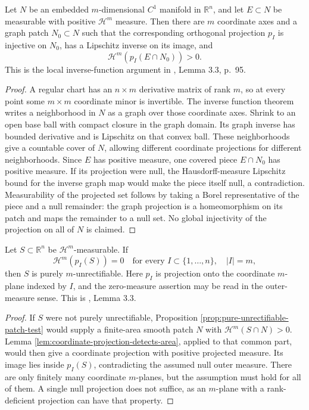 \begin{lemma}\label{lem:coordinate-projection-detects-area}
Let $N$ be an embedded $m$-dimensional $C^1$ manifold in $\mathbb R^n$, and let $E\subset N$ be measurable with positive $\mathcal H^m$ measure. Then there are $m$ coordinate axes and a graph patch $N_0\subset N$ such that the corresponding orthogonal projection $p_I$ is injective on $N_0$, has a Lipschitz inverse on its image, and
\[
 \mathcal H^m(p_I(E\cap N_0))>0.
\]
This is the local inverse-function argument in \cite{Sim18}, Lemma 3.3, p.~95.
\end{lemma}
\begin{proof}
A regular chart has an $n\times m$ derivative matrix of rank $m$, so at every point some $m\times m$ coordinate minor is invertible. The inverse function theorem writes a neighborhood in $N$ as a graph over those coordinate axes. Shrink to an open base ball with compact closure in the graph domain. Its graph inverse has bounded derivative and is Lipschitz on that convex ball. These neighborhoods give a countable cover of $N$, allowing different coordinate projections for different neighborhoods. Since $E$ has positive measure, one covered piece $E\cap N_0$ has positive measure. If its projection were null, the Hausdorff-measure Lipschitz bound for the inverse graph map would make the piece itself null, a contradiction. Measurability of the projected set follows by taking a Borel representative of the piece and a null remainder: the graph projection is a homeomorphism on its patch and maps the remainder to a null set. No global injectivity of the projection on all of $N$ is claimed.
\end{proof}

\begin{theorem}\label{thm:null-coordinate-projections-pure}
Let $S\subset\mathbb R^n$ be $\mathcal H^m$-measurable. If
\[
 \mathcal H^m(p_I(S))=0
 \quad\text{for every }I\subset\{1,\ldots,n\},\quad |I|=m,
\]
then $S$ is purely $m$-unrectifiable. Here $p_I$ is projection onto the coordinate $m$-plane indexed by $I$, and the zero-measure assertion may be read in the outer-measure sense. This is \cite{Sim18}, Lemma 3.3.
\end{theorem}
\begin{proof}
If $S$ were not purely unrectifiable, Proposition \ref{prop:pure-unrectifiable-patch-test} would supply a finite-area smooth patch $N$ with $\mathcal H^m(S\cap N)>0$. Lemma \ref{lem:coordinate-projection-detects-area}, applied to that common part, would then give a coordinate projection with positive projected measure. Its image lies inside $p_I(S)$, contradicting the assumed null outer measure. There are only finitely many coordinate $m$-planes, but the assumption must hold for all of them. A single null projection does not suffice, as an $m$-plane with a rank-deficient projection can have that property.
\end{proof}

